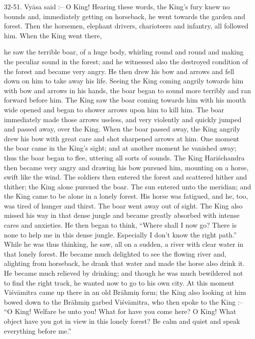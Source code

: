 32-51. Vy\=asa said :-- O King! Hearing these words, the King's fury knew no bounds and, immediately getting on horseback, he went towards the garden and forest. Then the horsemen, elephant drivers, charioteers and infantry, all followed him. When the King went there,

he saw the terrible boar, of a huge body, whirling round and round and making the peculiar sound in the forest; and he witnessed also the destroyed condition of the forest and became very angry. He then drew his bow and arrows and fell down on him to take away his life. Seeing the King coming angrily towards him with bow and arrows in his hands, the boar began to sound more terribly and ran forward before him. The King saw the boar coming towards him with his mouth wide opened and began to shower arrows upon him to kill him. The boar immediately made those arrows useless, and very violently and quickly jumped and passed away, over the King. When the boar passed away, the King angrily drew his bow with great care and shot sharpened arrows at him. One moment the boar came in the King's sight; and at another moment he vanished away; thus the boar began to flee, uttering all sorts of sounds. The King Hari\'schandra then became very angry and drawing his bow pursued him, mounting on a horse, swift like the wind. The soldiers then entered the forest and scattered hither and thither; the King alone pursued the boar. The sun entered unto the meridian; and the King came to be alone in a lonely forest. His horse was fatigued, and he, too, was tired of hunger and thirst. The boar went away out of sight. The King also missed his way in that dense jungle and became greatly absorbed with intense cares and anxieties. He then began to think, ``Where shall I now go? There is none to help me in this dense jungle. Especially I don't know the right path.'' While he was thus thinking, he saw, all on a sudden, a river with clear water in that lonely forest. He became much delighted to see the flowing river and, alighting from horseback, he drank that water and made the horse also drink it. He became much relieved by drinking; and though he was much bewildered not to find the right track, he wanted now to go to his own city. At this moment Vi\'sv\=amitra came up there in an old Br\=ahmi\d{n} form; the King also looking at him bowed down to the Br\=ahmi\d{n} garbed Vi\'sv\=amitra, who then spoke to the King :-- ``O King! Welfare be unto you! What for have you come here? O King! What object have you got in view in this lonely forest? Be calm and quiet and speak everything before me.''

